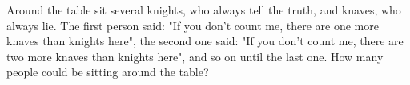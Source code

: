 \problem
Around the table sit several knights, who always tell the truth, and knaves, who always lie. The first person said: "If you don't count me, there are one more knaves than knights here", the second one said: "If you don't count me, there are two more knaves than knights here", and so on until the last one. How many people could be sitting around the table?
\solution
\endproblem
